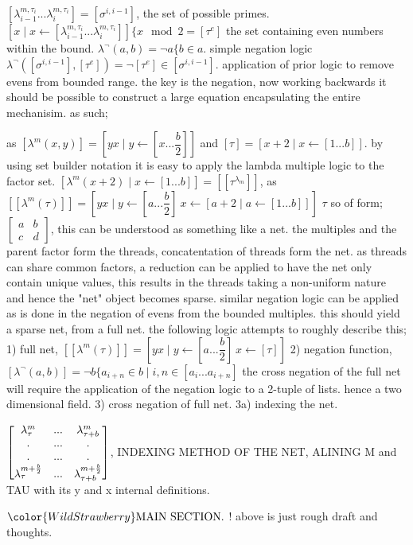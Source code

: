 $[\lambda^{m,\tau_i}_{i-1}...\lambda^{m,\tau_i}_{i}]=[\sigma^{i,i-1}]$, the set of possible primes. $[x\mid x\leftarrow[\lambda^{m,\tau_i}_{i-1}...\lambda^{m,\tau_i}_i]]\{x\mod{2}=[\tau^e]$
the set containing even numbers within the bound.
$\lambda^\neg(a,b) = \neg a \{b\in a$. simple negation logic
$\lambda^\neg([\sigma^{i,i-1}],[\tau^e])=\neg [\tau^e]\in [\sigma^{i,i-1}]$. application of prior logic to remove evens from bounded range.
the key is the negation, now working backwards it should be possible to construct a large equation encapsulating
the entire mechanisim. as such;


as $[\lambda^m(x,y)] = [yx\mid y\leftarrow[x...\dfrac{b}{2}]]$ and $[\tau] = [x+2\mid x\leftarrow[1...b]]$.
by using set builder notation it is easy to apply the lambda multiple logic to the
factor set. $[\lambda^m(x+2)\mid x\leftarrow [1...b]]=[[\tau^{\lambda_m}]]$, as
$[[\lambda^m(\tau)]]=[yx\mid y\leftarrow [a...\dfrac{b}{2}]\ x\leftarrow[a+2\mid a\leftarrow[1...b]]]$
$\tau$
so of form;  $\begin{bmatrix}
a&b\\
c&d
\end{bmatrix}$, this can be understood as something like a net. the multiples and the parent factor form the threads, concatentation of
threads form the net. as threads can share common factors, a reduction can be applied to have the net only contain unique values, this results
in the threads taking a non-uniform nature and hence the "net" object becomes sparse.
similar negation logic can be applied as is done in the negation of evens from the bounded multiples.
this should yield a sparse net, from a full net. the following logic attempts to roughly describe this;
1) full net, $[[\lambda^m(\tau)]]=[yx \mid y\leftarrow[a...\dfrac{b}{2}]\ x\leftarrow[\tau]]$
2) negation function,  $[\lambda^\neg(a,b)] = \neg b\{a_{i+n} \in b \mid i,n \in[a_i...a_{i+n}]$
the cross negation of the full net will require the application of the negation logic to a 2-tuple of lists.
hence a two dimensional field.
3) cross negation of full net.
3a) indexing the net.

$\begin{bmatrix} \lambda^m_\tau&...&\lambda^m_{\tau+b}\\.&...&.\\.&...&.\\
\lambda^{m+\tiny\frac{b}{2}}_\tau&...&\lambda^{m+\tiny\frac{b}{2}}_{\tau+b}\end{bmatrix}$, INDEXING METHOD OF THE NET, ALINING M and TAU with its y and x internal definitions.










$\color{WildStrawberry}\text{MAIN SECTION.}$ ! above is just rough draft and thoughts.

